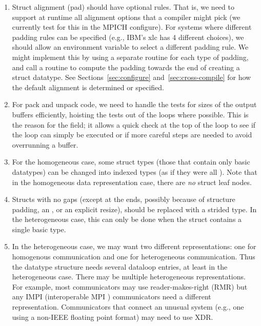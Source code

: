 \documentclass{article}
\begin{document}
\begin{enumerate}
\item Struct alignment (pad) should have optional rules.  That is, we
   need to support at runtime all alignment options that a compiler might pick
   (we currently test for this in the MPICH configure).  For systems
   where different padding rules can be specified (e.g., IBM's xlc has 4
   different choices), we should allow an environment variable to
   select a different padding rule.  We might implement this by using
   a separate routine for each type of padding, and call a routine to
   compute the padding towards the end of creating a struct datatype.
   See Sections~\ref{sec:configure} and~\ref{sec:cross-compile} for
   how the default alignment is determined or specified.

\item For pack and unpack code, we need to handle the tests for sizes of
    the output buffers efficiently, hoisting the tests out of the
    loops where possible.  This is the reason for the
     field; it allows a quick check at the top of
    the loop to see if the loop can simply be executed or if more careful
    steps are needed to avoid overrunning a buffer.

\item For the homogeneous case, some struct types (those that contain
    only basic datatypes) can be changed into indexed types (as if
    they were all ).  Note that in the homogeneous data
    representation case, there are \emph{no} struct leaf nodes.

\item Structs with no gaps (except at the ends, possibly because of 
    structure padding, an , or an explicit resize),
    should be replaced with a strided type.  In the heterogeneous
    case, this can only be done when the struct contains a single
    basic type.

\item In the heterogeneous case, we may want two different
    representations: one for homogenous communication and one for
    heterogeneous communication.  Thus the datatype structure needs
    several dataloop entries, at least in the heterogeneous case.
    There may be multiple heterogeneous representations.  For example, 
    most communicators may use reader-makes-right (RMR) \cite{Zhou:1995:RMR}
    but any IMPI (interoperable MPI \cite{impi}) communicators need a
    different 
    representation.  Communicators that connect an unusual system
    (e.g., one using a non-IEEE floating point format) may need to use
    XDR.  


\end{enumerate}
\end{document}
